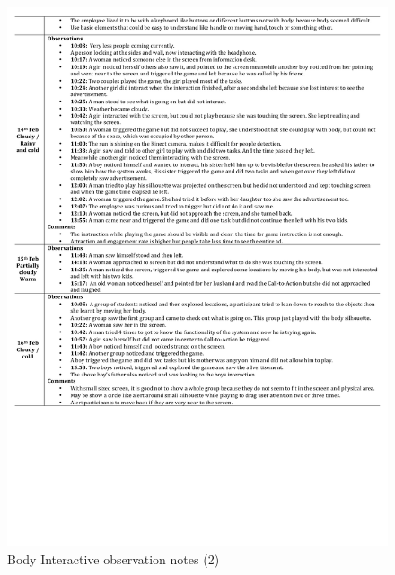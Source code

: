 \begin{appendices}
\begin{figure}[H]
 \centering 
    \includegraphics[width=\textwidth,height=0.8\textheight]{Appendices/8/body-interactive/Note_2.pdf}
    \caption{Body Interactive observation notes (2)}
     \label{app:body-Interactiveobservation-notes2}%
\end{figure}



\end{appendices}
